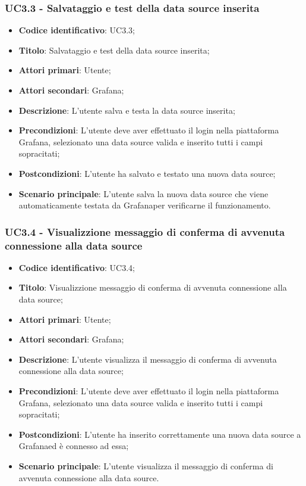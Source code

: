     \subsubsection{UC3.3 - Salvataggio e test della data source inserita}
        \begin{itemize}
            \item \textbf{Codice identificativo}: UC3.3;
            \item \textbf{Titolo}: Salvataggio e test della data source inserita;
            \item \textbf{Attori primari}: Utente;
            \item \textbf{Attori secondari}: Grafana\glo;
            \item \textbf{Descrizione}: L'utente salva e testa la data source inserita;
            \item \textbf{Precondizioni}: L'utente deve aver effettuato il login nella piattaforma Grafana\glo, selezionato una data source valida e inserito tutti i                                   campi sopracitati;
            \item \textbf{Postcondizioni}: L'utente ha salvato e testato una nuova data source;
            \item \textbf{Scenario principale}: L'utente salva la nuova data source che viene automaticamente testata da Grafana\glosp per verificarne il funzionamento.
        \end{itemize}
    \subsubsection{UC3.4 - Visualizzione messaggio di conferma di avvenuta connessione alla data source}
        \begin{itemize}
            \item \textbf{Codice identificativo}: UC3.4;
            \item \textbf{Titolo}: Visualizzione messaggio di conferma di avvenuta connessione alla data source;
            \item \textbf{Attori primari}: Utente;
            \item \textbf{Attori secondari}: Grafana\glo;
            \item \textbf{Descrizione}: L'utente visualizza il messaggio di conferma di avvenuta connessione alla data source;
            \item \textbf{Precondizioni}: L'utente deve aver effettuato il login nella piattaforma Grafana\glo, selezionato una data source valida e inserito tutti i                                   campi sopracitati;
            \item \textbf{Postcondizioni}: L'utente ha inserito correttamente una nuova data source a Grafana\glosp ed è connesso ad essa;
            \item \textbf{Scenario principale}: L'utente visualizza il messaggio di conferma di avvenuta connessione alla data source.
        \end{itemize}
